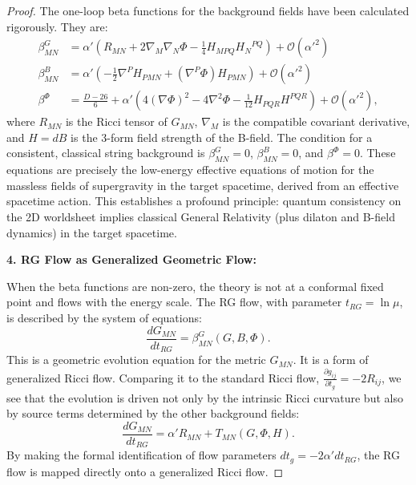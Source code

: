 \documentclass[11pt, letterpaper]{report}
\theoremstyle{plain} %
\theoremstyle{definition} %
\theoremstyle{remark} %
\begin{document}
\begin{proof}
The one-loop beta functions for the background fields have been calculated rigorously. They are:
\begin{align}
    \beta^G_{MN} &= \alpha' \left( R_{MN} + 2\nabla_M\nabla_N\Phi - \frac{1}{4}H_{MPQ}H_{N}{}^{PQ} \right) + \mathcal{O}(\alpha'^2) \label{eq:beta_G_full} \\
    \beta^B_{MN} &= \alpha' \left( -\frac{1}{2}\nabla^P H_{PMN} + (\nabla^P\Phi) H_{PMN} \right) + \mathcal{O}(\alpha'^2) \label{eq:beta_B_full} \\
    \beta^\Phi &= \frac{D-26}{6} + \alpha' \left( 4(\nabla\Phi)^2 - 4\nabla^2\Phi - \frac{1}{12}H_{PQR}H^{PQR} \right) + \mathcal{O}(\alpha'^2), \label{eq:beta_Phi_full}
\end{align}
where $R_{MN}$ is the Ricci tensor of $G_{MN}$, $\nabla_M$ is the compatible covariant derivative, and $H=dB$ is the 3-form field strength of the B-field. The condition for a consistent, classical string background is $\beta^G_{MN}=0$, $\beta^B_{MN}=0$, and $\beta^\Phi=0$. These equations are precisely the low-energy effective equations of motion for the massless fields of supergravity in the target spacetime, derived from an effective spacetime action. This establishes a profound principle: quantum consistency on the 2D worldsheet implies classical General Relativity (plus dilaton and B-field dynamics) in the target spacetime.

\textbf{4. RG Flow as Generalized Geometric Flow:}

When the beta functions are non-zero, the theory is not at a conformal fixed point and flows with the energy scale. The RG flow, with parameter $t_{RG} = \ln\mu$, is described by the system of equations:
\begin{equation}
    \frac{dG_{MN}}{dt_{RG}} = \beta^G_{MN}(G, B, \Phi).
    \label{eq:rg_flow_explicit_full}
\end{equation}
This is a geometric evolution equation for the metric $G_{MN}$. It is a form of generalized Ricci flow. Comparing it to the standard Ricci flow, $\frac{\partial g_{ij}}{\partial t_g} = -2R_{ij}$, we see that the evolution is driven not only by the intrinsic Ricci curvature but also by source terms determined by the other background fields:
\begin{equation}
    \frac{dG_{MN}}{dt_{RG}} = \alpha' R_{MN} + T_{MN}(G, \Phi, H).
\end{equation}
By making the formal identification of flow parameters $dt_g = -2\alpha' dt_{RG}$, the RG flow is mapped directly onto a generalized Ricci flow.


\end{proof}
\end{document}
